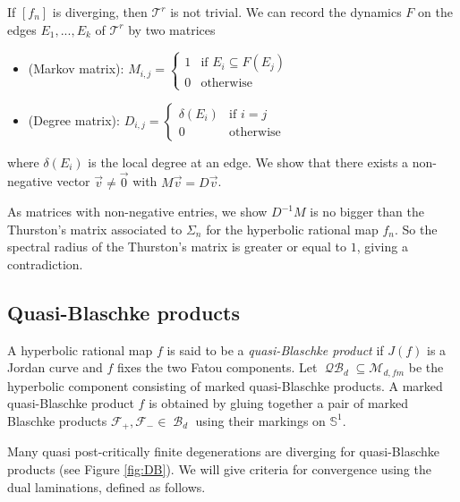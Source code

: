 \documentclass[11pt, reqno]{amsart}
\numberwithin{equation}{section}
\theoremstyle{plain}
\theoremstyle{theorem}
\theoremstyle{definition}
\newcommand{\RT}{\mathscr{T}}
\newcommand{\bp}{\mathcal{F}}
\DeclareMathOperator{\QH}{\mathcal{QB}}
\DeclareMathOperator{\BP}{\mathcal{B}}
\numberwithin{figure}{section}
\begin{document}
If $[f_n]$ is diverging, then $\RT^r$ is not trivial.
We can record the dynamics $F$ on the edges $E_1,..., E_k$ of $\RT^r$ by two matrices
\begin{itemize}
\item (Markov matrix): $M_{i,j} = \begin{cases} 1 &\mbox{if } E_i \subseteq F(E_j) \\ 
0 & \mbox{otherwise } \end{cases}$
\item (Degree matrix): $D_{i,j} = \begin{cases} \delta(E_i) &\mbox{if } i = j \\ 
0 & \mbox{otherwise } \end{cases}$
\end{itemize}
where $\delta(E_i)$ is the local degree at an edge.
We show that there exists a non-negative vector $\vec{v} \neq \vec{0}$ with $M\vec{v} = D\vec{v}$.

As matrices with non-negative entries, we show $D^{-1}M$ is no bigger than the Thurston's matrix associated to $\Sigma_n$ for the hyperbolic rational map $f_n$. 
So the spectral radius of the Thurston's matrix is greater or equal to $1$, giving a contradiction.



\subsection*{Quasi-Blaschke products}
A hyperbolic rational map $f$ is said to be a {\em quasi-Blaschke product} if $J(f)$ is a Jordan curve and $f$ fixes the two Fatou components.
Let $\QH_d \subseteq \mathcal{M}_{d,fm}$ be the hyperbolic component consisting of marked quasi-Blaschke products. 
A marked quasi-Blaschke product $f$ is obtained by gluing together a pair of marked Blaschke products $\bp_+, \bp_-\in \BP_d$ using their markings on $\mathbb{S}^1$.

Many quasi post-critically finite degenerations are diverging for quasi-Blaschke products (see Figure \ref{fig:DB}). We will give criteria for convergence using the dual laminations, defined as follows.
\end{document}
